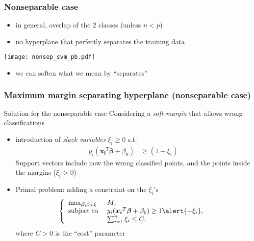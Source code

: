 \begin{frame}
   \frametitle{Nonseparable case}
   \begin{block}{}
      \begin{itemize}
      \item in general, overlap of the 2 classes (unless $n<p$)
      \item no hyperplane that perfectly separates the training data
      \end{itemize}
    \end{block}

   \begin{center}
      \texttt{[image: nonsep\_svm\_pb.pdf]}
   \end{center}
     \begin{itemize}
      \item[\doigtr] we can soften what we mean by ``separates''
      \end{itemize}
\end{frame}


\begin{frame}
   \frametitle{Maximum margin separating hyperplane (nonseparable case)}
   \begin{block}{Solution for the nonseparable case}
   Considering a {\em soft-margin} that allows  wrong classifications
      \begin{itemize}
      \item introduction of {\em slack variables} $\xi_i\ge 0$ s.t.
     \begin{align*}
         y_i(\boldsymbol{x_i}^T \boldsymbol{\beta} + \beta_0) & \ge (1-\xi_i)
      \end{align*}
      Support vectors include now the wrong classified points, and the points inside the margins ($\xi_i > 0$)
     \item Primal problem: adding a constraint on the $\xi_i$'s 
     $$\left\{ \begin{array}{ll}
       \max_{\bbeta,\beta_0,\xi} & M,\\
       \textrm{subject to } &   y_i(\boldsymbol{x_i}^T \boldsymbol{\beta} + \beta_0)  \ge 1 \alert{-\xi_i}, \\
       & \sum_{i=1}^n \xi_i \le C.
      \end{array} \right.$$
      where $C>0$ is the ``cost'' parameter
      \end{itemize}
    \end{block}

\end{frame}


